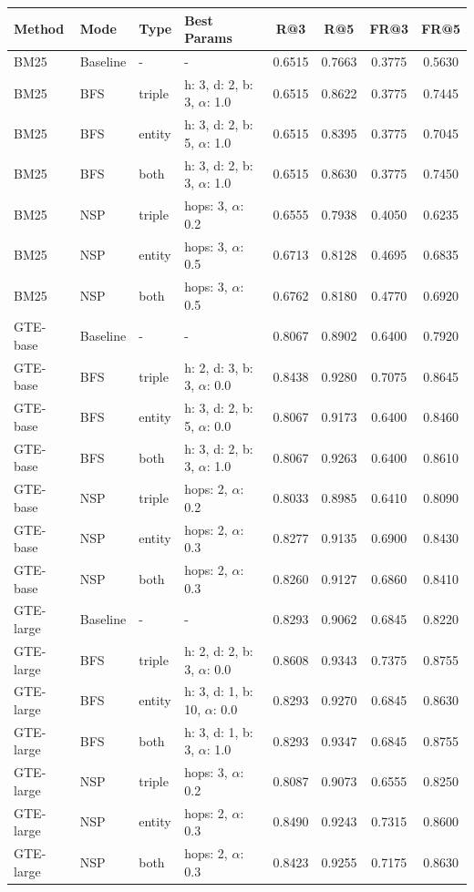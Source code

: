 \documentclass[11pt]{article}
\begin{document}
\begin{table}[t]
\centering
\footnotesize
\begin{tabular}{llllcccc}
\toprule
\textbf{Method} & \textbf{Mode} & \textbf{Type} & \textbf{Best Params} & \textbf{R@3} & \textbf{R@5} & \textbf{FR@3} & \textbf{FR@5} \\
\midrule

BM25 & Baseline & - & - & 0.6515 & 0.7663 & 0.3775 & 0.5630 \\
BM25 & BFS & triple & h: 3, d: 2, b: 3, $\alpha$: 1.0 & 0.6515 & 0.8622 & 0.3775 & 0.7445 \\
BM25 & BFS & entity & h: 3, d: 2, b: 5, $\alpha$: 1.0 & 0.6515 & 0.8395 & 0.3775 & 0.7045 \\
BM25 & BFS & both & h: 3, d: 2, b: 3, $\alpha$: 1.0 & 0.6515 & 0.8630 & 0.3775 & 0.7450 \\
BM25 & NSP & triple & hops: 3, $\alpha$: 0.2 & 0.6555 & 0.7938 & 0.4050 & 0.6235 \\
BM25 & NSP & entity & hops: 3, $\alpha$: 0.5 & 0.6713 & 0.8128 & 0.4695 & 0.6835 \\
BM25 & NSP & both & hops: 3, $\alpha$: 0.5 & 0.6762 & 0.8180 & 0.4770 & 0.6920 \\

GTE-base & Baseline & - & - & 0.8067 & 0.8902 & 0.6400 & 0.7920 \\
GTE-base & BFS & triple & h: 2, d: 3, b: 3, $\alpha$: 0.0 & 0.8438 & 0.9280 & 0.7075 & 0.8645 \\
GTE-base & BFS & entity & h: 3, d: 2, b: 5, $\alpha$: 0.0 & 0.8067 & 0.9173 & 0.6400 & 0.8460 \\
GTE-base & BFS & both & h: 3, d: 2, b: 3, $\alpha$: 1.0 & 0.8067 & 0.9263 & 0.6400 & 0.8610 \\
GTE-base & NSP & triple & hops: 2, $\alpha$: 0.2 & 0.8033 & 0.8985 & 0.6410 & 0.8090 \\
GTE-base & NSP & entity & hops: 2, $\alpha$: 0.3 & 0.8277 & 0.9135 & 0.6900 & 0.8430 \\
GTE-base & NSP & both & hops: 2, $\alpha$: 0.3 & 0.8260 & 0.9127 & 0.6860 & 0.8410 \\

GTE-large & Baseline & - & - & 0.8293 & 0.9062 & 0.6845 & 0.8220 \\
GTE-large & BFS & triple & h: 2, d: 2, b: 3, $\alpha$: 0.0 & 0.8608 & 0.9343 & 0.7375 & 0.8755 \\
GTE-large & BFS & entity & h: 3, d: 1, b: 10, $\alpha$: 0.0 & 0.8293 & 0.9270 & 0.6845 & 0.8630 \\
GTE-large & BFS & both & h: 3, d: 1, b: 3, $\alpha$: 1.0 & 0.8293 & 0.9347 & 0.6845 & 0.8755 \\
GTE-large & NSP & triple & hops: 3, $\alpha$: 0.2 & 0.8087 & 0.9073 & 0.6555 & 0.8250 \\
GTE-large & NSP & entity & hops: 2, $\alpha$: 0.3 & 0.8490 & 0.9243 & 0.7315 & 0.8600 \\
GTE-large & NSP & both & hops: 2, $\alpha$: 0.3 & 0.8423 & 0.9255 & 0.7175 & 0.8630 \\


\end{tabular}
\end{table}
\end{document}
